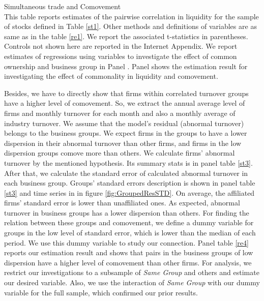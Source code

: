 	\begin{table}[htbp]
		\centering
		\caption{Simultaneous trade and Comovement\\ \small
			This table reports \cite{FamaMacBeth} estimates of the pairwise correlation in liquidity for the sample of stocks defined in Table \ref{st1}. Other methods and definitions of variables are as same as in the table \ref{re1}. We report the associated t-statistics in parentheses. Controls not shown here are reported in the Internet Appendix. We report estimates of regressions using variables to investigate the effect of common ownership and business group in Panel . Panel  shows the estimation result for investigating the effect of commonality in liquidity and comovement. }
		\label{re3}
		\label{mresult2-turnover}
		
		\resizebox{\textwidth}{!}{
			\centering
			
		}
		\bigskip
		\label{turncomovement}
		\resizebox{\textwidth}{!}{
			\centering
			
		}
	
	\end{table}
\restoregeometry


Besides, we have to directly show that firms within correlated turnover groups have a higher level of comovement. So, we extract the annual average level of firms and monthly turnover for each month and also a monthly average of industry turnover. We assume that the model's residual (abnormal turnover) belongs to the business groups. We expect firms in the groups to have a lower dispersion in their abnormal turnover than other firms, and firms in the low dispersion groups comove more than others. We calculate firms' abnormal turnover by the mentioned hypothesis. Its summary stats is in panel  table \ref{st3}. After that, we calculate the standard error of calculated abnormal turnover in each business group. Groups' standard errors description is shown in  panel  table \ref{st3} and time series in in figure \ref{fig:GroupedResSTD}. On average, the affiliated firms' standard error is lower than unaffiliated ones. As expected, abnormal turnover in business groups has a lower dispersion than others. For finding the relation between these groups and comovement, we define a dummy variable for groups in the low level of standard error, which is lower than the median of each period. We use this dummy variable to study our connection. Panel  table \ref{re4} reports our estimation result and shows that pairs in the business groups of low dispersion have a higher level of comovement than other firms. For analysis, we restrict our investigations to a subsample of \textit{Same Group} and others and estimate our desired variable.   Also, we use the interaction of \textit{Same Group} with our dummy variable for the full sample, which confirmed our prior results. 



